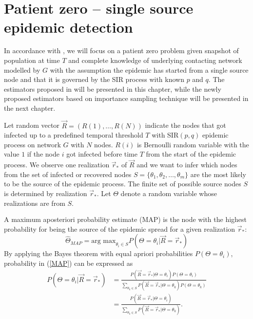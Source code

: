 \documentclass[times, utf8, diplomski]{fer}
\begin{document}
\chapter{Patient zero -- single source epidemic detection}


In accordance with \cite{Nino}, we will focus on a patient zero problem given snapshot of population at time $T$ and complete knowledge of underlying contacting network modelled by $G$ with the assumption the epidemic has started from a single source node and that it is governed by the SIR process with known $p$ and $q$.  The estimators proposed in \cite{Nino} will be presented in this chapter, while the newly proposed estimators based on importance sampling  technique will be presented in the next chapter.

Let random vector $\vec R = (R(1), \ldots, R(N))$ indicate the nodes that got infected up to a predefined temporal threshold $T$ with SIR$(p, q)$ epidemic process on network $G$ with $N$ nodes. $R(i)$ is Bernoulli random variable with the value $1$ if the node $i$ got infected before time $T$ from the start of the epidemic process. We observe one realization $\vec r_*$ of $\vec R$ and we want to infer which nodes from the set of infected or recovered nodes $S = \{\theta_1, \theta_2, \ldots, \theta_m \}$ are the most likely to be the source of the epidemic process.  The finite set of possible source nodes $S$ is determined by realization $\vec r_*$. Let $\Theta$ denote a random variable whose realizations are from $S$.

A maximum aposteriori probability estimate (MAP) is the node with the highest probability for being the source of the epidemic spread for a given realization $\vec r_*$: 
\begin{equation}
\hat{\Theta}_{MAP} = \text{arg max}_{\theta_i \in S} P(\Theta = \theta_i | \vec{R} = \vec r_*)
\label{MAP}
\end{equation}
By applying the Bayes theorem with equal apriori probabilities $P(\Theta = \theta_i)$, probability in (\ref{MAP}) can be expressed as 
\begin{equation}
\begin{aligned}
P(\Theta = \theta_i | \vec{R} = \vec r_*) &= \frac{P(\vec R = \vec r_* | \Theta = \theta_i) P(\Theta = \theta_i)}{\sum_{\theta_k \in S} P(\vec R = \vec r_* | \Theta = \theta_k) P(\Theta = \theta_k)} \\ &= \frac{P(\vec R = \vec r_* | \Theta = \theta_i)}{\sum_{\theta_k \in S} P(\vec R = \vec r_* | \Theta = \theta_k)}.
\end{aligned}
\label{MAP_pravi}
\end{equation}
\end{document}
